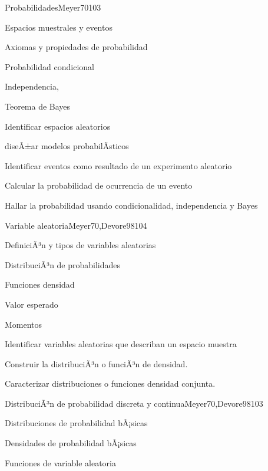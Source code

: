 \begin{syllabus}
\begin{unit}{Probabilidades}{Meyer70}{10}{3}
\begin{topics}
      \item Espacios muestrales y eventos
      \item Axiomas y propiedades de probabilidad
      \item Probabilidad condicional
      \item Independencia,
      \item Teorema de Bayes
   \end{topics}
   \begin{unitgoals}
      \item Identificar espacios aleatorios
      \item diseÃ±ar  modelos probabilÃ­sticos
      \item Identificar eventos como resultado de un experimento aleatorio
      \item Calcular la probabilidad de ocurrencia de un evento
      \item Hallar la probabilidad usando condicionalidad, independencia y Bayes
   \end{unitgoals}
\end{unit}

\begin{unit}{Variable aleatoria}{Meyer70,Devore98}{10}{4}
\begin{topics}
      \item DefiniciÃ³n y tipos de variables aleatorias
      \item DistribuciÃ³n de probabilidades
      \item Funciones densidad
      \item Valor esperado
      \item Momentos
   \end{topics}

   \begin{unitgoals}
      \item Identificar variables aleatorias que describan un espacio muestra
      \item Construir la distribuciÃ³n o funciÃ³n de densidad.
      \item Caracterizar distribuciones o funciones densidad conjunta.
   \end{unitgoals}
\end{unit}

\begin{unit}{DistribuciÃ³n de probabilidad discreta y continua}{Meyer70,Devore98}{10}{3}
\begin{topics}
      \item Distribuciones de probabilidad bÃ¡sicas
      \item Densidades de probabilidad bÃ¡sicas
      \item Funciones de variable aleatoria
   \end{topics}


\end{unit}
\end{syllabus}
